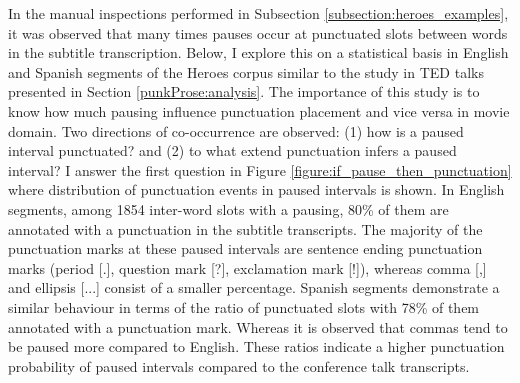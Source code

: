 In the manual inspections performed in Subsection \ref{subsection:heroes_examples}, it was observed that many times pauses occur at punctuated slots between words in the subtitle transcription. Below, I explore this on a statistical basis in English and Spanish segments of the Heroes corpus similar to the study in TED talks presented in Section \ref{punkProse:analysis}. The importance of this study is to know how much pausing influence punctuation placement and vice versa in movie domain. Two directions of co-occurrence are observed: (1) how is a paused interval punctuated? and (2) to what extend punctuation infers a paused interval? I answer the first question in Figure \ref{figure:if_pause_then_punctuation} where distribution of punctuation events in paused intervals is shown. In English segments, among 1854 inter-word slots with a pausing, 80\% of them are annotated with a punctuation in the subtitle transcripts. The majority of the punctuation marks at these paused intervals are sentence ending punctuation marks (period [.], question mark [?], exclamation mark [!]), whereas comma [,] and ellipsis [...] consist of a smaller percentage. Spanish segments demonstrate a similar behaviour in terms of the ratio of punctuated slots with 78\% of them annotated with a punctuation mark. Whereas it is observed that commas tend to be paused more compared to English. These ratios indicate a higher punctuation probability of paused intervals compared to the conference talk transcripts. 

